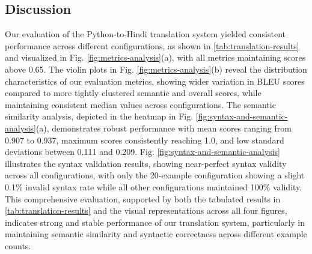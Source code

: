 \documentclass[11pt,a4paper]{article}
\begin{document}
\subsection{Discussion}
Our evaluation of the Python-to-Hindi translation system yielded consistent performance across different configurations, as shown in \ref{tab:translation-results} and visualized in Fig. \ref{fig:metrics-analysis}(a), with all metrics maintaining scores above 0.65. The violin plots in Fig.  \ref{fig:metrics-analysis}(b) reveal the distribution characteristics of our evaluation metrics, showing wider variation in BLEU scores compared to more tightly clustered semantic and overall scores, while maintaining consistent median values across configurations. The semantic similarity analysis, depicted in the heatmap in Fig. \ref{fig:syntax-and-semantic-analysis}(a), demonstrates robust performance with mean scores ranging from 0.907 to 0.937, maximum scores consistently reaching 1.0, and low standard deviations between 0.111 and 0.209. Fig. \ref{fig:syntax-and-semantic-analysis} illustrates the syntax validation results, showing near-perfect syntax validity across all configurations, with only the 20-example configuration showing a slight 0.1\% invalid syntax rate while all other configurations maintained 100\% validity. This comprehensive evaluation, supported by both the tabulated results in \ref{tab:translation-results} and the visual representations across all four figures, indicates strong and stable performance of our translation system, particularly in maintaining semantic similarity and syntactic correctness across different example counts.
\end{document}
